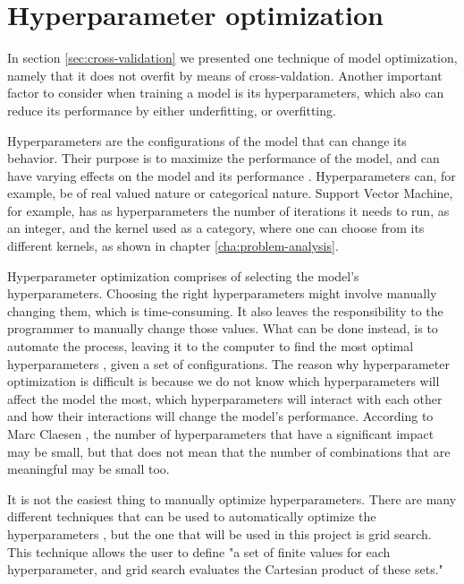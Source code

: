 \section{Hyperparameter optimization}\label{sec:hyperparam}

In section \ref{sec:cross-validation} we presented one technique of model optimization, namely that it does not overfit by means of cross-valdation. Another important factor to consider when training a model is its hyperparameters, which also can reduce its performance by either underfitting, or overfitting.


Hyperparameters are the configurations of the model that can change its behavior. Their purpose is to maximize the performance of the model, and can have varying effects on the model and its performance \cite{hyperparam-search}. Hyperparameters can, for example, be of real valued nature or categorical nature. Support Vector Machine, for example, has as hyperparameters the number of iterations it needs to run, as an integer, and the kernel used as a category, where one can choose from its different kernels, as shown in chapter \ref{cha:problem-analysis}.


Hyperparameter optimization comprises of selecting the model's hyperparameters. Choosing the right hyperparameters might involve manually changing them, which is time-consuming. It also leaves the responsibility to the programmer to manually change those values. What can be done instead, is to automate the process, leaving it to the computer to find the most optimal hyperparameters \cite{automated-machine-learning}, given a set of configurations. The reason why hyperparameter optimization is difficult is because we do not know which hyperparameters will affect the model the most, which hyperparameters will interact with each other and how their interactions will change the model's performance. According to Marc Claesen \cite{hyperparam-search}, the number of hyperparameters that have a significant impact may be small, but that does not mean that the number of combinations that are meaningful may be small too. 

It is not the easiest thing to manually optimize hyperparameters. There are many different techniques that can be used to automatically optimize the hyperparameters \cite{automated-machine-learning}, but the one that will be used in this project is grid search. This technique allows the user to define "a set of finite values for each hyperparameter, and grid search evaluates the Cartesian product of these sets."\cite{automated-machine-learning} 


